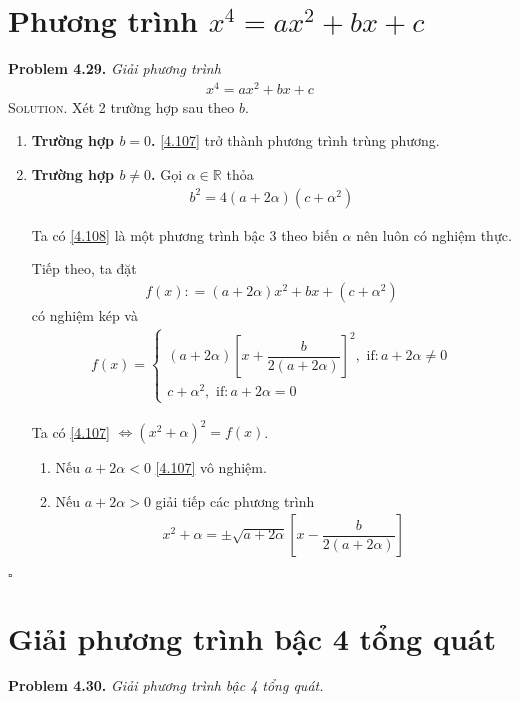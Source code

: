\documentclass[a4paper,oneside]{book}
\numberwithin{equation}{chapter}
\begin{document}
\section{Phương trình ${x^4} = a{x^2} + bx + c$}
\textbf{Problem 4.29.} \textit{Giải phương trình}
\begin{align}
\label{4.107}
{x^4} = a{x^2} + bx + c
\end{align}
\textsc{Solution.} Xét 2 trường hợp sau theo $b$.
\begin{enumerate}
\item \textbf{Trường hợp $b=0$.} \eqref{4.107} trở thành phương trình trùng phương.
\item \textbf{Trường hợp $b \ne 0$.} Gọi $\alpha  \in \mathbb{R}$ thỏa
\begin{align}
\label{4.108}
{b^2} = 4\left( {a + 2\alpha } \right)\left( {c + {\alpha ^2}} \right)
\end{align}

Ta có \eqref{4.108} là một phương trình bậc 3 theo biến $\alpha$ nên luôn có nghiệm thực.

Tiếp theo, ta đặt
\begin{align}
f\left( x \right): = \left( {a + 2\alpha } \right){x^2} + bx + \left( {c + {\alpha ^2}} \right)
\end{align}
có nghiệm kép và
\begin{align}
f\left( x \right) = \left\{ {\begin{array}{*{20}{c}}
{\left( {a + 2\alpha } \right){{\left[ {x + \dfrac{b}{{2\left( {a + 2\alpha } \right)}}} \right]}^2},\mbox{ if}:a + 2\alpha  \ne 0}\\
{c + {\alpha ^2},\mbox{ if}  :a + 2\alpha  = 0}
\end{array}} \right.
\end{align}

Ta có \eqref{4.107} $ \Leftrightarrow {\left( {{x^2} + \alpha } \right)^2} = f\left( x \right)$.
\begin{enumerate}
\item Nếu $a + 2\alpha  < 0$ \eqref{4.107} vô nghiệm.
\item Nếu $a + 2\alpha  > 0$ giải tiếp các phương trình
\begin{align}
{x^2} + \alpha  =  \pm \sqrt {a + 2\alpha } \left[ {x - \dfrac{b}{{2\left( {a + 2\alpha } \right)}}} \right]
\end{align}
\end{enumerate}
\end{enumerate}
\hfill $\square$
\section{Giải phương trình bậc 4 tổng quát}
\textbf{Problem 4.30.} \textit{Giải phương trình bậc 4 tổng quát.}\\
\end{document}
